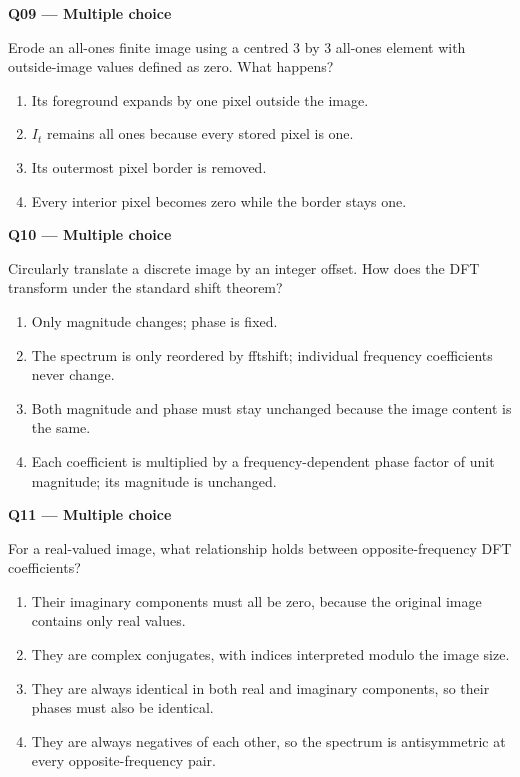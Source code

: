 \documentclass[11pt,a4paper]{article}
\begin{document}
\par\vspace{12pt}
\begin{minipage}{\linewidth}
\textbf{Q09 — Multiple choice}\par\smallskip
Erode an all-ones finite image using a centred 3 by 3 all-ones element with outside-image values defined as zero. What happens?
\begin{enumerate}[label=\textbf{\Alph*.}]
\item Its foreground expands by one pixel outside the image.
\item \(I_t\) remains all ones because every stored pixel is one.
\item Its outermost pixel border is removed.
\item Every interior pixel becomes zero while the border stays one.
\end{enumerate}
\end{minipage}
\par\vspace{12pt}
\begin{minipage}{\linewidth}
\textbf{Q10 — Multiple choice}\par\smallskip
Circularly translate a discrete image by an integer offset. How does the DFT transform under the standard shift theorem?
\begin{enumerate}[label=\textbf{\Alph*.}]
\item Only magnitude changes; phase is fixed.
\item The spectrum is only reordered by fftshift; individual frequency coefficients never change.
\item Both magnitude and phase must stay unchanged because the image content is the same.
\item Each coefficient is multiplied by a frequency-dependent phase factor of unit magnitude; its magnitude is unchanged.
\end{enumerate}
\end{minipage}
\par\vspace{12pt}
\begin{minipage}{\linewidth}
\textbf{Q11 — Multiple choice}\par\smallskip
For a real-valued image,\allowbreak{} what relationship holds between opposite-frequency DFT coefficients?
\begin{enumerate}[label=\textbf{\Alph*.}]
\item Their imaginary components must all be zero,\allowbreak{} because the original image contains only real values.
\item They are complex conjugates,\allowbreak{} with indices interpreted modulo the image size.
\item They are always identical in both real and imaginary components,\allowbreak{} so their phases must also be identical.
\item They are always negatives of each other,\allowbreak{} so the spectrum is antisymmetric at every opposite-frequency pair.
\end{enumerate}
\end{minipage}
\end{document}
